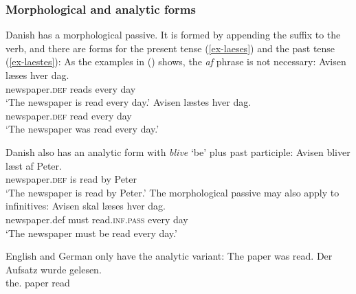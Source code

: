 \subsubsection{Morphological and analytic forms}

Danish has a morphological passive. It is formed by appending the suffix  to the verb, and there
are forms for the present tense (\ref{ex-laeses}) and the past tense (\ref{ex-laestes}):
\eal
{}
\zl
As the examples in () shows, the \emph{af} phrase is not necessary:
\eal
\ex 
\gll Avisen        læses           hver   dag.\\
     newspaper.\textsc{def} reads  every day\\\danish
\glt `The newspaper is read every day.'
\ex 
\gll Avisen        læstes           hver   dag.\\
     newspaper.\textsc{def} read  every day\\\danish
\glt `The newspaper was read every day.'
\zl

\noindent
Danish also has an analytic form with \emph{blive} `be' plus past participle: 
\ea
\gll Avisen                 bliver læst af Peter.\\
     newspaper.\textsc{def} is     read by Peter\\\danish
\glt `The newspaper is read by Peter.'
\z
The morphological passive may also apply to infinitives:
\ea
\gll Avisen skal læses hver dag.\\
     newspaper.def must read.\textsc{inf}.\textsc{pass} every day\\\danish
\glt `The newspaper must be read every day.'
\z

\noindent
English and German only have the analytic variant:
\eal
\ex The paper was read.
\ex 
\gll Der        Aufsatz wurde  gelesen.\\
     the.\NOM{} paper   \AUX{} read\\\german
\zl    






